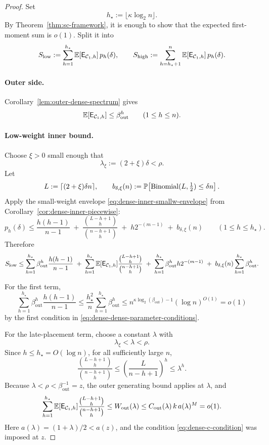 \begin{proof}
Set
\[
h_\star:=\lfloor \kappa\log_2 n\rfloor.
\]
By Theorem~\ref{thm:sc-framework}, it is enough to show that the expected first-moment sum is \(o(1)\).  Split it into
\[
S_{\mathrm{low}}
:=
\sum_{h=1}^{h_\star} \mathbb{E}[\mathsf{E}_{{\mathcal{C}_1},h}]\,p_h(\delta),
\qquad
S_{\mathrm{high}}
:=
\sum_{h=h_\star+1}^{n} \mathbb{E}[\mathsf{E}_{{\mathcal{C}_1},h}]\,p_h(\delta).
\]

\paragraph{Outer side.}
Corollary~\ref{lem:outer-dense-spectrum} gives
\[
\mathbb{E}[\mathsf{E}_{{\mathcal{C}_1},h}] \le \beta_{\mathrm{out}}^h
\qquad (1\le h\le n).
\]

\paragraph{Low-weight inner bound.}
Choose \(\xi>0\) small enough that
\[
\lambda_\xi:=(2+\xi)\delta<\rho.
\]
Let
\[
L:=\lceil(2+\xi)\delta n\rceil,
\qquad
b_{\delta,\xi}(n):=
\mathbb{P}\!\left[\operatorname{Binomial}(L,\tfrac12)\le \delta n\right].
\]
Apply the small-weight envelope \eqref{eq:dense-inner-smallw-envelope} from
Corollary~\ref{cor:dense-inner-piecewise}:
\[
p_h(\delta)
\le
\frac{h(h-1)}{n-1}
\;+\;
\frac{\binom{L-h+1}{h}}{\binom{n-h+1}{h}}
\;+\;
h2^{-(m-1)}
\;+\;
b_{\delta,\xi}(n)
\qquad (1\le h\le h_\star).
\]
Therefore
\[
S_{\mathrm{low}}
\le
\sum_{h=1}^{h_\star}\beta_{\mathrm{out}}^h\frac{h(h-1)}{n-1}
\;+\;
\sum_{h=1}^{h_\star}\mathbb{E}[\mathsf{E}_{{\mathcal{C}_1},h}]
\frac{\binom{L-h+1}{h}}{\binom{n-h+1}{h}}
\;+\;
\sum_{h=1}^{h_\star}\beta_{\mathrm{out}}^h h2^{-(m-1)}
\;+\;
b_{\delta,\xi}(n)\sum_{h=1}^{h_\star}\beta_{\mathrm{out}}^h.
\]

For the first term,
\[
\sum_{h=1}^{h_\star}\beta_{\mathrm{out}}^h\frac{h(h-1)}{n-1}
\le
\frac{h_\star^2}{n}\sum_{h=1}^{h_\star}\beta_{\mathrm{out}}^h
\le
n^{\kappa\log_2(\beta_{\mathrm{out}})-1}(\log n)^{O(1)}
=o(1)
\]
by the first condition in \eqref{eq:dense-dense-parameter-conditions}.

For the late-placement term, choose a constant \(\lambda\) with
\[
\lambda_\xi<\lambda<\rho.
\]
Since \(h\le h_\star=O(\log n)\), for all sufficiently large \(n\),
\[
\frac{\binom{L-h+1}{h}}{\binom{n-h+1}{h}}
\le
\left(\frac{L}{n-h+1}\right)^h
\le
\lambda^h .
\]
Because \(\lambda<\rho<\beta_{\mathrm{out}}^{-1}=z\), the outer generating
bound applies at \(\lambda\), and
\[
\sum_{h=1}^{h_\star}\mathbb{E}[\mathsf{E}_{{\mathcal{C}_1},h}]
\frac{\binom{L-h+1}{h}}{\binom{n-h+1}{h}}
\le
W_{\mathrm{out}}(\lambda)
\le
C_{\mathrm{out}}(\lambda)\,k\,a(\lambda)^M
=o(1).
\]
Here \(a(\lambda)=(1+\lambda)/2<a(z)\), and the condition
\eqref{eq:dense-c-condition} was imposed at \(z\).


\end{proof}
